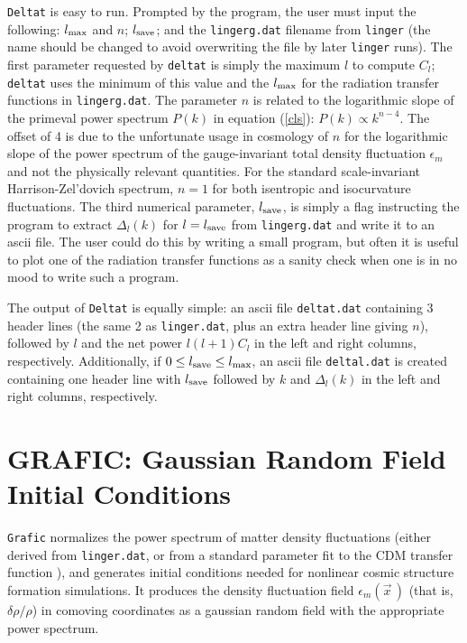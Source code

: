 {\tt Deltat} is easy to run.  Prompted by the program, the user must
input the following: $l_{\rm max}$ and $n$; $l_{\rm save}$; and the
{\tt lingerg.dat} filename from {\tt linger} (the name should be changed
to avoid overwriting the file by later {\tt linger} runs).  The first
parameter requested by {\tt deltat} is simply the maximum $l$ to compute
$C_l$; {\tt deltat} uses the minimum of this value and the $l_{\rm max}$
for the radiation transfer functions in {\tt lingerg.dat}.  The parameter
$n$ is related to the logarithmic slope of the primeval power spectrum $P(k)$
in equation (\ref{cls}): $P(k)\propto k^{n-4}$.  The offset of 4 is due to
the unfortunate usage in cosmology of $n$ for the logarithmic slope of
the power spectrum of the gauge-invariant total density fluctuation
$\epsilon_m$ and not the physically relevant quantities.  For the standard
scale-invariant Harrison-Zel'dovich spectrum, $n=1$ for both isentropic
and isocurvature fluctuations.  The third numerical parameter,
$l_{\rm save}$, is simply a flag instructing the program to extract
$\Delta_l(k)$ for $l=l_{\rm save}$ from {\tt lingerg.dat} and write it
to an ascii file.  The user could do this by writing a small program, but
often it is useful to plot one of the radiation transfer functions as a
sanity check when one is in no mood to write such a program.

The output of {\tt Deltat} is equally simple: an ascii file {\tt deltat.dat}
containing 3 header lines (the same 2 as {\tt linger.dat}, plus an extra header
line giving $n$), followed by $l$ and the net power $l(l+1)C_l$ in the left
and right columns, respectively.  Additionally, if $0\le l_{\rm save}\le
l_{\rm max}$, an ascii file {\tt deltal.dat} is created containing one
header line with $l_{\rm save}$ followed by $k$ and $\Delta_l(k)$ in the
left and right columns, respectively.


\section{GRAFIC: Gaussian Random Field Initial Conditions}

{\tt Grafic} normalizes the power spectrum of matter density fluctuations
(either derived from {\tt linger.dat}, or from a standard parameter fit
to the CDM transfer function \cite{bbks}), and generates initial conditions
needed for nonlinear cosmic structure formation simulations.   It produces
the density fluctuation field $\epsilon_m(\vec x\,)$ (that is, $\delta\rho/
\rho$) in comoving coordinates as a gaussian random field with the
appropriate power spectrum.

